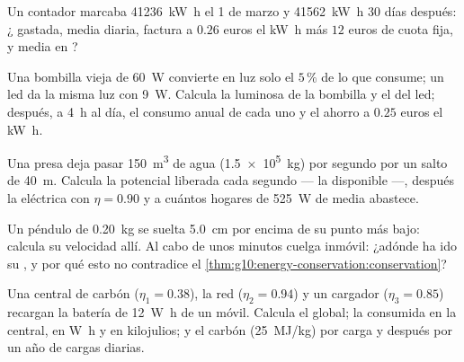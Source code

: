 \begin{exercise}[$\star\star$]\label{exo:g10:energy-conservation:8}
Un contador marcaba \qty{41236}{kW.h} el 1 de marzo y \qty{41562}{kW.h}
30 días después: ¿ gastada, media diaria, factura a $0.26$ euros
el \unit{kW.h} más $12$ euros de cuota fija, y  media en ?
\end{exercise}

\begin{exercise}[$\star\star$]\label{exo:g10:energy-conservation:9}
Una bombilla vieja de \qty{60}{W} convierte en luz solo el $5\,\%$ de lo
que consume; un led da la misma luz con \qty{9}{W}. Calcula la 
luminosa de la bombilla y el  del led; después, a \qty{4}{h}
al día, el consumo anual de cada uno y el ahorro a $0.25$ euros el
\unit{kW.h}.
\end{exercise}

\begin{exercise}[$\star\star$]\label{exo:g10:energy-conservation:10}
Una presa deja pasar \qty{150}{m^3} de agua (\qty{1.5e5}{kg}) por
segundo por un salto de \qty{40}{m}. Calcula la  potencial
liberada cada segundo --- la  disponible ---, después la
 eléctrica con $\eta = 0.90$ y a cuántos hogares de
\qty{525}{W} de media abastece.
\end{exercise}

\begin{exercise}[$\star\star$]\label{exo:g10:energy-conservation:11}
Un péndulo de \qty{0.20}{kg} se suelta \qty{5.0}{cm} por encima de su
punto más bajo: calcula su velocidad allí. Al cabo de unos minutos
cuelga inmóvil: ¿adónde ha ido su , y por qué esto no contradice
el \cref{thm:g10:energy-conservation:conservation}?
\end{exercise}

\begin{exercise}[$\star\star\star$]\label{exo:g10:energy-conservation:12}
Una central de carbón ($\eta_1 = 0.38$), la red ($\eta_2 = 0.94$) y un
cargador ($\eta_3 = 0.85$) recargan la batería de \qty{12}{W.h} de un
móvil. Calcula el  global; la  consumida en la
central, en \unit{W.h} y en kilojulios; y el carbón (\qty{25}{MJ/kg})
por carga y después por un año de cargas diarias.
\end{exercise}

